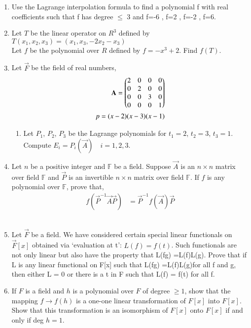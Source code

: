 \renewcommand{\theequation}{\theenumi}
\renewcommand{\thefigure}{\theenumi}
\begin{enumerate}[label=\thesubsection.\arabic*.,ref=\thesubsection.\theenumi]

\item Use the Lagrange interpolation formula to find a polynomial f with real coefficients such that f has degree $\leq$ 3 and f=-6 , f=2 , f=-2 , f=6.
%
\\
\solution

\item Let $T$ be the linear operator on $R^3$ defined by\\
$T(x_1,x_2,x_3)=(x_1,x_3,-2x_2-x_3)$\\
Let $f$ be the polynomial over $R$ defined by $f=-x^3+2$. Find $f(T)$.
%
\\
\solution

\item Let $\vec{F}$ be the field of real numbers, 
\begin{align}
\mathbf{A}=\begin{pmatrix}2&0&0&0\\0&2&0&0\\0&0&3&0\\0&0&0&1\end{pmatrix}\\
p= (x - 2)(x - 3)(x - 1) 
\end{align}
\begin{enumerate}
\item Let $P_1$, $P_2$, $P_3$ be the Lagrange polynomials for $t_1 = 2$, $t_2 = 3$, $t_3 = 1$. Compute $E_i = P_i(\vec{A})\quad i = 1, 2, 3$. 
%
\\
\solution

\end{enumerate}
\item Let $n$ be a positive integer and $\mathbb{F}$ be a field. Suppose $\vec{A}$ is an $n \times n$ matrix over field $\mathbb{F}$ and $\vec{P}$ is an invertible $n \times n$ matrix over field $\mathbb{F}$. If $f$ is any polynomial over $\mathbb{F}$, prove
that,
\begin{align}
f(\vec{P}^{-1}\vec{A}\vec{P}) &= \vec{P}^{-1}f(\vec{A})\vec{P}
\end{align}
%
\\
\solution

\item Let $\vec{F}$ be a field. We have considered certain special linear functionals on $\vec{F}[x]$
obtained via ‘evaluation at t’:
$L(f) = f(t)$.
Such functionals are not only linear but also have the property that L(fg) =L(f)L(g). Prove that if L is any linear functional on F[x] such that L(fg) =L(f)L(g)for all f and g, then either L = 0 or there is a t in F such that L(f) = f(t) for all f.
%
\\
\solution

\item If $F$ is a field and $h$ is a polynomial over $F$ of degree $\geq 1$,  show that the mapping $f \rightarrow f(h)$ is a one-one linear transformation of $F[x]$ into $F[x]$. Show that this transformation is an isomorphism of $F[x]$ onto $F[x]$ if and only if deg $h = 1$. 
%
\\
\solution

\end{enumerate}
